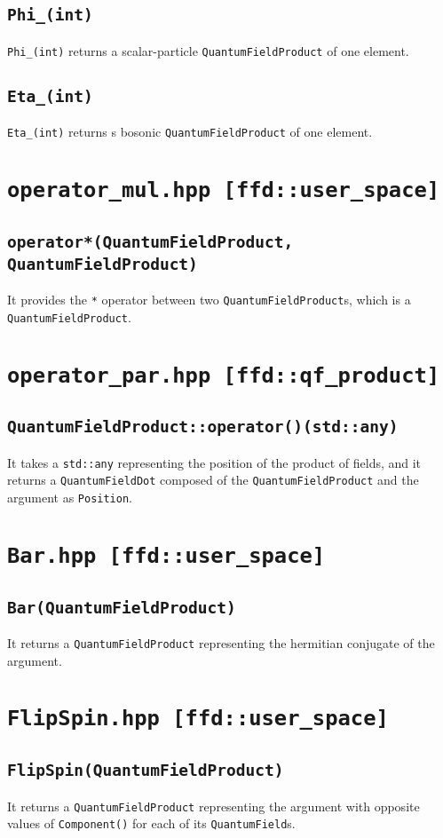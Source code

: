 \subsection{\texttt{Phi\_(int)}}
\texttt{Phi\_(int)} returns a scalar-particle \texttt{QuantumFieldProduct} of one element.
\subsection{\texttt{Eta\_(int)}}
\texttt{Eta\_(int)} returns s bosonic \texttt{QuantumFieldProduct} of one element.
\section{\texttt{operator\_mul.hpp [ffd::user\_space]}}
\subsection{\texttt{operator*(QuantumFieldProduct, QuantumFieldProduct)}}
It provides the \texttt{*} operator between two \texttt{QuantumFieldProduct}s, which is a \texttt{QuantumFieldProduct}.
\section{\texttt{operator\_par.hpp [ffd::qf\_product]}}
\subsection{\texttt{QuantumFieldProduct::operator()(std::any)}}
It takes a \texttt{std::any} representing the position of the product of fields, and it returns a \texttt{QuantumFieldDot} composed of the \texttt{QuantumFieldProduct} and the argument as \texttt{Position}.
\section{\texttt{Bar.hpp [ffd::user\_space]}}
\subsection{\texttt{Bar(QuantumFieldProduct)}}
It returns a \texttt{QuantumFieldProduct} representing the hermitian conjugate of the argument.
\section{\texttt{FlipSpin.hpp [ffd::user\_space]}}
\subsection{\texttt{FlipSpin(QuantumFieldProduct)}}
It returns a \texttt{QuantumFieldProduct} representing the argument with opposite values of \texttt{Component()} for each of its \texttt{QuantumField}s.
